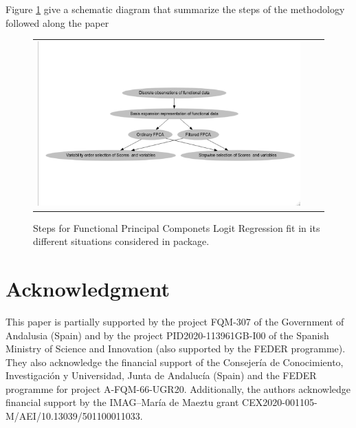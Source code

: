 Figure \ref{Diag} give a schematic diagram that summarize the steps of the  methodology followed along the paper

\begin{figure}
\begin{center}
\begin{tabular}{ccc}
\includegraphics[width=1.0\textwidth]{Graphs/Diagram.png}
\end{tabular}
\end{center}
\caption{Steps for Functional Principal Componets Logit Regression fit in its different situations considered in  package.}
\label{Diag}
\end{figure}


\section{Acknowledgment}

This paper is partially supported by the project FQM-307 of the Government of Andalusia (Spain) and  by the project PID2020-113961GB-I00 of the Spanish Ministry of Science and Innovation (also supported by the FEDER programme). They also acknowledge the financial support of the Consejería de Conocimiento, Investigación y Universidad, Junta de Andalucía (Spain) and the FEDER programme for project A-FQM-66-UGR20. Additionally, the authors acknowledge financial support by the IMAG–María de Maeztu grant CEX2020-001105-M/AEI/10.13039/501100011033.



\address{Manuel Escabias\\
  Department of Statistics and Operation Research, University of Granada\\
  Facultad de Farmacia, Campus de Cartuja. 18071 Granada\\
  Spain\\
  ORCiD: 0000-0002-1653-9022\\
  }

